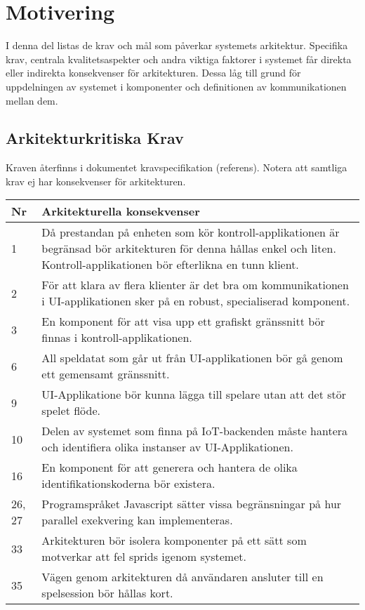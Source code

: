 \section{Motivering}
I denna del listas de krav och mål som påverkar systemets arkitektur. Specifika krav, centrala kvalitetsaspekter och andra viktiga faktorer i systemet får direkta eller indirekta konsekvenser för arkitekturen. Dessa låg till grund för uppdelningen av systemet i komponenter och definitionen av kommunikationen mellan dem.

\subsection{Arkitekturkritiska Krav}
Kraven återfinns i dokumentet kravspecifikation (referens). Notera att samtliga krav ej har konsekvenser för arkitekturen.\\

\begin{center}
    \begin{tabular}{|p{1cm}|p{13cm}|}
        \hline
        \textbf{Nr} & \textbf{Arkitekturella konsekvenser}\\
        \hline
        1 & Då prestandan på enheten som kör kontroll-applikationen är begränsad bör arkitekturen för denna hållas enkel och liten. Kontroll-applikationen bör efterlikna en tunn klient.\\
        \hline
        2 & För att klara av flera klienter är det bra om kommunikationen i UI-applikationen sker på en robust, specialiserad komponent.\\
        \hline
        3 & En komponent för att visa upp ett grafiskt gränssnitt bör finnas i kontroll-applikationen.\\
        \hline
        6 & All speldatat som går ut från UI-applikationen bör gå genom ett gemensamt gränssnitt.\\
        \hline
        9 & UI-Applikatione bör kunna lägga till spelare utan att det stör spelet flöde.\\
        \hline
        10 & Delen av systemet som finna på IoT-backenden måste hantera och identifiera olika instanser av UI-Applikationen.\\
        \hline
        16 & En komponent för att generera och hantera de olika identifikationskoderna bör existera.\\
        \hline
        26, 27 & Programspråket Javascript sätter vissa begränsningar på hur parallel exekvering kan implementeras.\\
        \hline
        33 & Arkitekturen bör isolera komponenter på ett sätt som motverkar att fel sprids igenom systemet.\\
        \hline
        35 & Vägen genom arkitekturen då användaren ansluter till en spelsession bör hållas kort.\\
        \hline
    \end{tabular}
\end{center}

